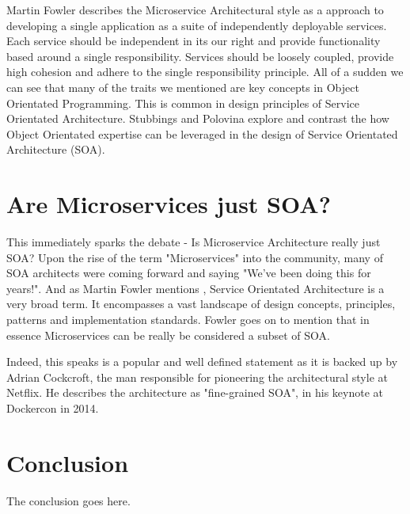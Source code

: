 \documentclass[journal]{IEEEtran}
\begin{document}
Martin Fowler describes the Microservice Architectural style as a approach to developing a single application as a suite of independently deployable services. \cite{MicroservicesResourceGuide} Each service should be independent in its our right and provide functionality based around a single responsibility. Services should be loosely coupled, provide high cohesion and adhere to the single responsibility principle. All of a sudden we can see that many of the traits we mentioned are key concepts in Object Orientated Programming. This is common in design principles of Service Orientated Architecture. Stubbings and Polovina \cite{StubbingsPolovina} explore and contrast the how Object Orientated expertise can be leveraged in the design of Service Orientated Architecture (SOA).



\section{Are Microservices just SOA?}

This immediately sparks the debate - Is Microservice Architecture really just SOA? Upon the rise of the term "Microservices" into the community, many of SOA architects were coming forward and saying "We've been doing this for years!". And as Martin Fowler mentions \cite{GOTOConference}, Service Orientated Architecture is a very broad term. It encompasses a vast landscape of design concepts, principles, patterns and implementation standards. Fowler goes on to mention that in essence Microservices can be really be considered a subset of SOA.

Indeed, this speaks is a popular and well defined statement as it is backed up by Adrian Cockcroft, the man responsible for pioneering the architectural style at Netflix. He describes the architecture as "fine-grained SOA", in his keynote at Dockercon in 2014. \cite{adriancockcroft} 

\section{Conclusion}
The conclusion goes here.

\newpage
\printbibliography

\end{document}

